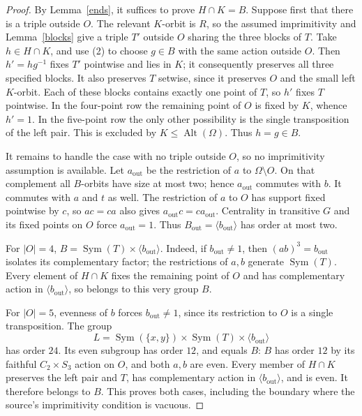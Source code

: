 \documentclass[a4paper,11pt]{article}
\newcommand{\gen}[1]{\langle#1\rangle}
\newcommand{\Sym}{\operatorname{Sym}}
\newcommand{\Alt}{\operatorname{Alt}}
\begin{document}
\begin{proof}
By Lemma~\ref{ends}, it suffices to prove $H\cap K=B$.
Suppose first that there is a triple outside $O$. The relevant $K$-orbit
is $R$, so the assumed imprimitivity and Lemma~\ref{blocks} give a triple
$T'$ outside $O$ sharing the three blocks of $T$. Take $h\in H\cap K$,
and use (2) to choose $g\in B$ with the same action outside $O$.
Then $h'=hg^{-1}$ fixes $T'$ pointwise and lies in $K$; it consequently
preserves all three specified blocks. It also preserves $T$ setwise,
since it preserves $O$ and the small left $K$-orbit. Each of these blocks
contains exactly one point of $T$, so $h'$ fixes $T$ pointwise.
In the four-point row the remaining point of $O$ is fixed by $K$, whence
$h'=1$. In the five-point row the only other possibility is the single
transposition of the left pair. This is excluded by $K\leq\Alt(\Omega)$.
Thus $h=g\in B$.

It remains to handle the case with no triple outside $O$, so no
imprimitivity assumption is available. Let $a_{\mathrm{out}}$ be the
restriction of $a$ to $\Omega\setminus O$. On that complement all
$B$-orbits have size at most two; hence $a_{\mathrm{out}}$ commutes with
$b$. It commutes with $a$ and $t$ as well. The restriction of $a$ to $O$
has support fixed pointwise by $c$, so $ac=ca$ also gives
$a_{\mathrm{out}}c=ca_{\mathrm{out}}$. Centrality in transitive $G$ and
its fixed points on $O$ force $a_{\mathrm{out}}=1$. Thus
$B_{\mathrm{out}}=\gen{b_{\mathrm{out}}}$ has order at most two.

For $|O|=4$, $B=\Sym(T)\times\gen{b_{\mathrm{out}}}$.
Indeed, if $b_{\mathrm{out}}\ne1$, then $(ab)^3=b_{\mathrm{out}}$
isolates its complementary factor; the restrictions of $a,b$ generate
$\Sym(T)$. Every element of $H\cap K$ fixes the remaining point of $O$
and has complementary action in $\gen{b_{\mathrm{out}}}$, so belongs to
this very group $B$.

For $|O|=5$, evenness of $b$ forces $b_{\mathrm{out}}\ne1$, since its
restriction to $O$ is a single transposition. The group
\[
 L=\Sym(\{x,y\})\times\Sym(T)\times\gen{b_{\mathrm{out}}}
\]
has order $24$. Its even subgroup has order $12$, and equals $B$:
$B$ has order $12$ by its faithful $C_2\times S_3$ action on $O$, and
both $a,b$ are even. Every member of $H\cap K$ preserves the left pair
and $T$, has complementary action in $\gen{b_{\mathrm{out}}}$, and is
even. It therefore belongs to $B$. This proves both cases, including the
boundary where the source's imprimitivity condition is vacuous.
\end{proof}
\end{document}
